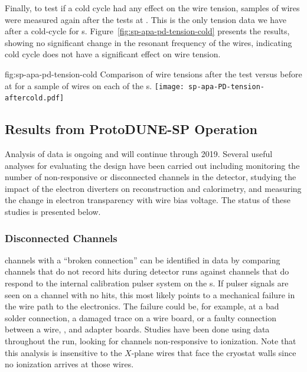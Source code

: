 Finally, to test if a cold cycle had any effect on the wire tension, samples of wires were measured again after the \coldbox tests at . This is the only tension data we have after a cold-cycle for  s. Figure~\ref{fig:sp-apa-pd-tension-cold} presents the results, showing no significant change in the resonant frequency of the wires, indicating cold cycle does not have a significant effect on wire tension.

\begin{dunefigure}{fig:sp-apa-pd-tension-cold}
{Comparison of wire tensions after the \coldbox test versus before at  for a sample of wires on each of the  s.}
\texttt{[image: sp-apa-PD-tension-aftercold.pdf]} 
\end{dunefigure}

\subsection{Results from ProtoDUNE-SP Operation}
\label{sec:fdsp-apa-qa-protodune-ops}


Analysis of  data is ongoing and will continue through 2019.  Several useful analyses for evaluating the  design have been carried out including monitoring the number of non-responsive or disconnected channels in the detector, studying the impact of the electron diverters on reconstruction and calorimetry, and measuring the change in electron transparency with wire bias voltage.  The status of these studies is presented below.   


\subsubsection{Disconnected Channels}
\label{sec:fdsp-apa-qa-protodune-ops-dead-channels}



 channels with a ``broken connection'' can be identified in  data by comparing channels that do not record hits during detector runs against channels that do respond to the internal calibration pulser system on the s.  If pulser signals are seen on a channel with no hits, this most likely points to a mechanical failure in the wire path to the electronics.  The failure could be, for example, at a bad solder connection, a damaged trace on a wire board, or a faulty connection between a wire, , and  adapter boards. Studies have been done using data throughout the  run, looking for channels non-responsive to ionization. Note that this analysis is insensitive to the $X$-plane wires that face the cryostat walls since no ionization arrives at those wires.

